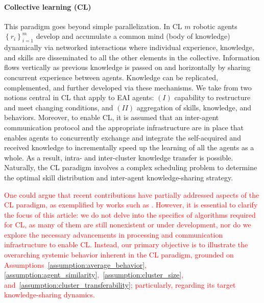 \documentclass[12pt]{article}
\newcommand\myhl[1]{\textcolor{red}{#1}}
\begin{document}
\paragraph*{\textbf{Collective learning (CL)}}
This paradigm  goes beyond simple parallelization. In CL $m$ robotic agents $ \left\lbrace r_i \right\rbrace_{i=1}^{m} $  develop and accumulate a common mind (body of knowledge) dynamically via networked interactions where individual experience, knowledge, and skills are disseminated to all the other elements in the collective. Information flows vertically as previous knowledge is passed on and horizontally by sharing concurrent experience between agents. Knowledge can be replicated, complemented, and further developed via these mechanisms. We take from \cite{Garavan2012CollectiveLearning} two notions central in CL that apply to EAI agents:
$(I)$ capability to restructure and meet changing conditions, and $(II)$ aggregation of skills, knowledge, and behaviors. Moreover, to enable CL, it is assumed that an inter-agent communication protocol and the appropriate infrastructure are in place that enables agents to concurrently exchange and integrate the self-acquired and received knowledge to incrementally speed up the learning of all the agents as a whole. As a result, intra- and inter-cluster knowledge transfer is possible. Naturally, the CL paradigm involves a complex scheduling problem to determine the optimal skill distribution and inter-agent knowledge-sharing strategy. 

\myhl{One could argue that recent contributions have partially addressed aspects of the CL paradigm, as exemplified by works such as \cite{levine2018learning, rudin2022learning, flairop2023}. However, it is essential to clarify the focus of this article: we do not delve into the specifics of algorithms required for CL, as many of them are still nonexistent or under development, nor do we explore the necessary advancements in processing and communication infrastructure to enable CL. Instead, our primary objective is to illustrate the overarching systemic behavior inherent in the CL paradigm, grounded on Assumptions~\ref{assumption:average_behavior}, \ref{assumption:agent_similarity},~\ref{assumption:cluster_size}, and~\ref{assumption:cluster_transferability}; particularly,  regarding its target knowledge-sharing dynamics.} 
\end{document}
